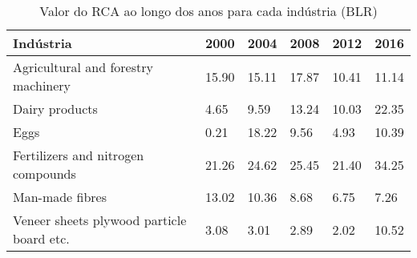 \begin{table}
\centering
\caption{Valor do RCA ao longo dos anos para cada indústria (BLR)}
\begin{tabular}{p{6cm}p{1.5cm}p{1.5cm}p{1.5cm}p{1.5cm}p{1.5cm}}
\toprule
                                Indústria &  2000 &  2004 &  2008 &  2012 &  2016 \\
\midrule
      Agricultural and forestry machinery & 15.90 & 15.11 & 17.87 & 10.41 & 11.14 \\
                           Dairy products &  4.65 &  9.59 & 13.24 & 10.03 & 22.35 \\
                                     Eggs &  0.21 & 18.22 &  9.56 &  4.93 & 10.39 \\
       Fertilizers and nitrogen compounds & 21.26 & 24.62 & 25.45 & 21.40 & 34.25 \\
                          Man-made fibres & 13.02 & 10.36 &  8.68 &  6.75 &  7.26 \\
Veneer sheets plywood particle board etc. &  3.08 &  3.01 &  2.89 &  2.02 & 10.52 \\
\bottomrule
\end{tabular}
\end{table}
